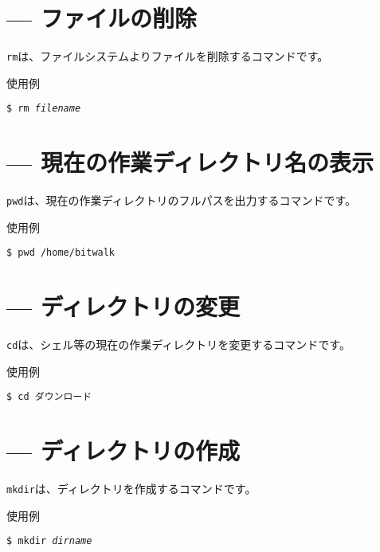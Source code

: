 \documentclass[a4j]{jreport}
\begin{document}
\section{\texttt{} --- ファイルの削除}

\texttt{rm}は、ファイルシステムよりファイルを削除するコマンドです。

\begin{itembox}[l]{使用例}
	\begin{alltt}\texttt{\$ rm \textit{filename}}\end{alltt}
\end{itembox}

\section{\texttt{} --- 現在の作業ディレクトリ名の表示}

\texttt{pwd}は、現在の作業ディレクトリのフルパスを出力するコマンドです。

\begin{itembox}[l]{使用例}
	\begin{alltt}\texttt{\$ pwd
			/home/bitwalk}\end{alltt}
\end{itembox}

\section{\texttt{} --- ディレクトリの変更}

\texttt{cd}は、シェル等の現在の作業ディレクトリを変更するコマンドです。

\begin{itembox}[l]{使用例}
	\begin{alltt}\texttt{\$ cd ダウンロード}\end{alltt}
\end{itembox}

\section{\texttt{} --- ディレクトリの作成}

\texttt{mkdir}は、ディレクトリを作成するコマンドです。

\begin{itembox}[l]{使用例}
	\begin{alltt}\texttt{\$ mkdir \textit{dirname}}\end{alltt}
\end{itembox}
\end{document}
